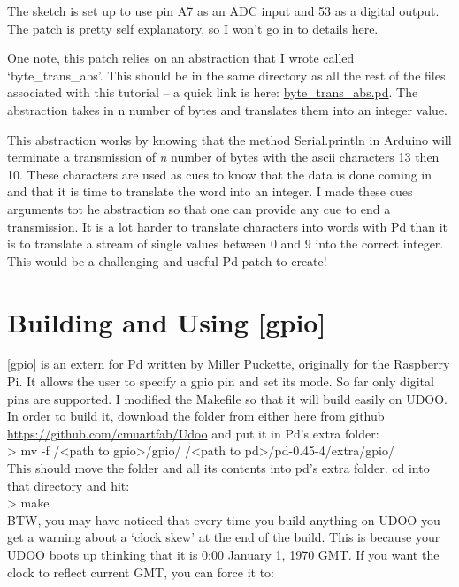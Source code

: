 \documentclass{article}
\begin{document}
The sketch is set up to use pin A7 as an ADC input and 53 as a digital output. The patch is pretty self explanatory, so I won't go in to details here. 

One note, this patch relies on an abstraction that I wrote called `byte\_trans\_abs'. This should be in the same directory as all the rest of the files associated with this tutorial -- a quick link is here: \url{byte\_trans\_abs.pd}. The abstraction takes in n number of bytes and translates them into an integer value. 

This abstraction works by knowing that the method Serial.println in Arduino will terminate a transmission of \emph{n} number of bytes with the ascii characters 13 then 10. These characters are used as cues to know that the data is done coming in and that it is time to translate the word into an integer. I made these cues arguments tot he abstraction so that one can provide any cue to end a transmission. It is a lot harder to translate characters into words with Pd than it is to translate a stream of single values between 0 and 9 into the correct integer. This would be a challenging and useful Pd patch to create!

\section{Building and Using [gpio]}
[gpio] is an extern for Pd written by Miller Puckette, originally for the Raspberry Pi. It allows the user to specify a gpio pin and set its mode. So far only digital pins are supported. I modified the Makefile so that it will build easily on UDOO. In order to build it, download the folder from either here from github \url{https://github.com/cmuartfab/Udoo} and put it in Pd's extra folder:\\

\textgreater{} mv -f /\textless{}path to gpio\textgreater/gpio/ /\textless{}path to pd\textgreater{}/pd-0.45-4/extra/gpio/\\

This should move the folder and all its contents into pd's extra folder. cd into that directory and hit:\\

\textgreater{} make\\

BTW, you may have noticed that every time you build anything on UDOO you get a warning about a `clock skew' at the end of the build. This is because your UDOO boots up thinking that it is 0:00 January 1, 1970 GMT. If you want the clock to reflect current GMT, you can force it to:\\
\end{document}
